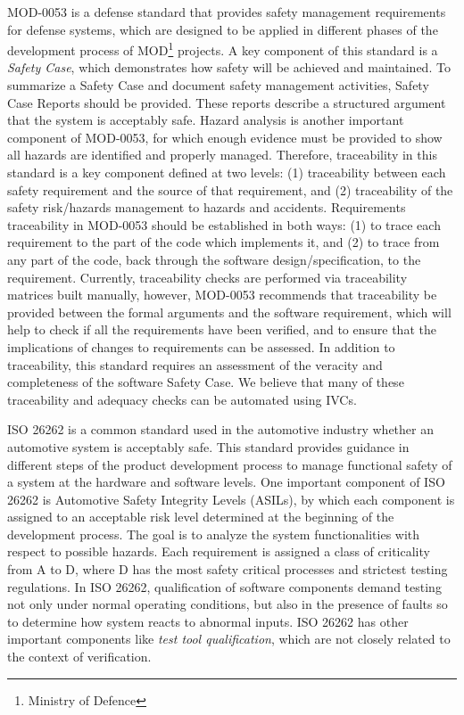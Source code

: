 MOD-0053 \cite{standard2007standard} is a defense standard that provides safety management requirements for defense systems, which are designed to be applied in different phases of the development process of MOD\footnote{Ministry of Defence} projects. A key component of this standard is a
\emph{Safety Case}, which demonstrates how safety will be achieved and maintained. To summarize a Safety Case and document safety management activities, Safety Case Reports should be provided. These reports describe a structured argument that the system is acceptably safe. Hazard analysis is another important component of MOD-0053, for which enough evidence must be provided to show all hazards are identified and properly managed. Therefore, traceability in this standard is a key component defined at two levels: (1) traceability  between each safety
requirement and the source of that requirement, and (2) traceability of the safety
risk/hazards management to hazards and accidents. Requirements traceability in MOD-0053 should be established in both ways: (1) to trace each requirement to the
part of the code which implements it, and (2) to trace from any part of the
code, back through the software design/specification, to the requirement. Currently, traceability checks are performed via traceability matrices built manually, however, MOD-0053 recommends that traceability be provided between the formal arguments and the software
requirement, which will help to check if all the requirements have
been verified, and to ensure that the implications of changes to requirements can be assessed. In addition to traceability, this standard requires an assessment of the veracity and completeness of the software Safety Case.  We believe that many of these traceability and adequacy checks can be automated using IVCs.

ISO 26262 \cite{iso201126262} is a common standard used in the automotive industry whether an automotive system is acceptably safe. This standard provides guidance in different steps of the product development process to manage functional safety of a system at the hardware and software levels.
One important component of ISO 26262 is Automotive Safety Integrity Levels (ASILs), by which each component is assigned to an acceptable risk level determined at the beginning of the development process. The goal is to analyze the system functionalities with respect to possible hazards. Each requirement is assigned a class of criticality from A to D, where D has the most safety critical processes and strictest testing regulations. In ISO 26262, qualification of software components demand testing not only under normal operating conditions, but also in the presence of faults so to determine how system reacts to abnormal inputs.  ISO 26262 has other important components like \emph{test tool qualification}, which are not closely related to the context of verification.

